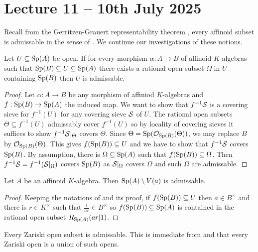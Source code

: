 \section{Lecture 11 -- 10th July 2025}\label{sec: lecture 11}
Recall from the Gerritzen-Grauert representability theorem , every affinoid subset is admissable in the sense of . We continue our investigations of these notions. 
\begin{lemma}\label{lem: sandwich implies admissable}
    Let $U\subseteq\mathrm{Sp}(A)$ be open. If for every morphism $\alpha:A\to B$ of affinoid $K$-algebras such that $\mathrm{Sp}(B)\subseteq U\subseteq\mathrm{Sp}(A)$ there exists a rational open subset $\Omega$ in $U$ containing $\mathrm{Sp}(B)$ then $U$ is admissable. 
\end{lemma}
\begin{proof}
    Let $\alpha:A\to B$ be any morphism of affiniod $K$-algebras and $f:\mathrm{Sp}(B)\to\mathrm{Sp}(A)$ the induced map. We want to show that $f^{-1}\mathcal{S}$ is a covering sieve for $f^{-1}(U)$ for any covering sieve $\mathcal{S}$ of $U$. The rational open subsets $\Theta\subseteq f^{-1}(U)$ admissably cover $f^{-1}(U)$ so by locality of covering sieves it suffices to show $f^{-1}\mathcal{S}|_{\Theta}$ covers $\Theta$. Since $\Theta=\mathrm{Sp}(\mathcal{O}_{\mathrm{Sp}(B)}(\Theta))$, we may replace $B$ by $\mathcal{O}_{\mathrm{Sp}(B)}(\Theta)$. This gives $f(\mathrm{Sp}(B))\subseteq U$ and we have to show that $f^{-1}\mathcal{S}$ covers $\mathrm{Sp}(B)$. By assumption, there is $\Omega\subseteq\mathrm{Sp}(A)$ such that $f(\mathrm{Sp}(B))\subseteq\Omega$. Then $f^{-1}\mathcal{S}=f^{-1}(\mathcal{S}|_{\Omega})$ covers $\mathrm{Sp}(B)$ as $\mathcal{S}|_{\Omega}$ covers $\Omega$ and such $\Omega$ are admissable. 
\end{proof}
\begin{lemma}\label{lem: distinguished opens are admissable}
    Let $A$ be an affinoid $K$-algebra. Then $\mathrm{Sp}(A)\setminus V(a)$ is admissable. 
\end{lemma}
\begin{proof}
    Keeping the notations of  and its proof, if $f(\mathrm{Sp}(B))\subseteq U$ then $a\in B^{\times}$ and there is $r\in K^{\times}$ such that $\frac{1}{ar}\in B^{\times}$ so $f(\mathrm{Sp}(B))\subseteq\mathrm{Sp}(A)$ is contained in the rational open subset $R_{\mathrm{Sp}(A)}(ar|1)$. 
\end{proof}
\begin{example}
    Every Zariski open subset is admissable. This is immediate from  and that every Zariski open is a union of such opens. 
\end{example}
